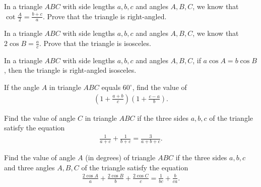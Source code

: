 \documentclass[12pt,a4paper]{memoir}
\theoremstyle{definition}
\begin{document}
\begin{question}
	In a triangle $ABC$ with side lengths $a,b,c$ and angles $A,B,C$, we know that $\displaystyle \cot \frac{A}{2}= \frac{b+c}{a}$.
	Prove that the triangle is right-angled.
\end{question}


\begin{question}
	In a triangle $ABC$ with side lengths $a,b,c$ and angles $A,B,C$, we know that $\displaystyle 2\cos B= \frac{a}{c}$.
	Prove that the triangle is isosceles.
\end{question}


\begin{question}
	In a triangle $ABC$ with side lengths $a,b,c$ and angles $A,B,C$, if $a\cos A = b \cos B$, then the triangle is right-angled isosceles.
\end{question}

\begin{question}
	If the angle $A$ in triangle $ABC$ equals $60^\circ$, find the value of
	\begin{align*}
		\left(1+\frac{a+b}{c}\right)\left(1+\frac{c-a}{b}\right).
	\end{align*}
\end{question}


\begin{question}
	Find the value of angle $C$ in triangle $ABC$ if the three sides $a,b,c$ of the triangle satisfy the equation
	\begin{align*}
		\frac{1}{a+c}+\frac{1}{b+c}=\frac{3}{a+b+c}.
	\end{align*}
\end{question}



\begin{question}
	Find the value of angle $A$ (in degrees) of triangle $ABC$ if the three sides $a,b,c$ and three angles $A,B,C$ of the triangle satisfy the equation
	\begin{align*}
		\frac{2\cos A}{a}+\frac{2\cos B}{b}+\frac{2\cos C}{c}=\frac{1}{bc}+\frac{b}{ca}.
	\end{align*}
\end{question}
\end{document}
